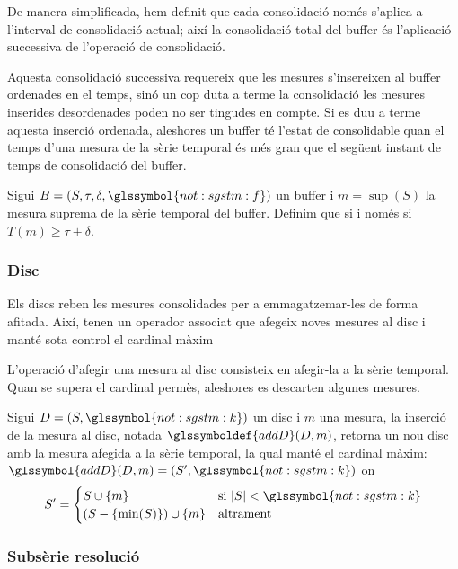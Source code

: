 De manera simplificada, hem definit que cada consolidació només
s'aplica a l'interval de consolidació actual; així la consolidació
total del buffer és l'aplicació successiva de l'operació de
consolidació. 

Aquesta consolidació successiva requereix que les mesures s'insereixen
al buffer ordenades en el temps, sinó un cop duta a terme la
consolidació les mesures inserides desordenades poden no ser tingudes
en compte. Si es duu a terme aquesta inserció ordenada, aleshores un
buffer té l'estat de consolidable quan el temps d'una mesura de la
sèrie temporal és més gran que el següent instant de temps de
consolidació del buffer.
\begin{definition}\label{def:model:buffer_consolidable}
  Sigui $B=(S,\tau,\delta,\glssymbol{not:sgstm:f})$ un buffer i
  $m=\sup(S)$ la mesura suprema de la sèrie temporal del
  buffer. Definim que 
  si i només si $T(m) \geq \tau+\delta$. 
\end{definition}



\subsubsection{Disc}

Els discs reben les mesures consolidades per a emmagatzemar-les de
forma afitada. Així, tenen un operador associat que afegeix noves
mesures al disc i manté sota control el cardinal màxim


L'operació d'afegir una mesura al disc consisteix en afegir-la a la
sèrie temporal. Quan se supera el cardinal permès, aleshores es
descarten algunes mesures.
\begin{definition}
  Sigui $D=(S,\glssymbol{not:sgstm:k})$ un disc i $m$ una mesura, la
  inserció de la mesura al disc, notada $\glssymboldef{addD}(D,m)$,
  retorna un nou disc amb la mesura afegida a la sèrie
  temporal, la qual manté el cardinal màxim:
  $\glssymbol{addD}(D,m) = (S',\glssymbol{not:sgstm:k})$ on 
\[
S'=
  \begin{cases}
      S\cup\{m\} &\text{si }  |S|<\glssymbol{not:sgstm:k}\\
      (S-\{\min(S)\}) \cup \{m\} &\text{altrament}
    \end{cases}
\]
\end{definition}




\subsubsection{Subsèrie resolució}

